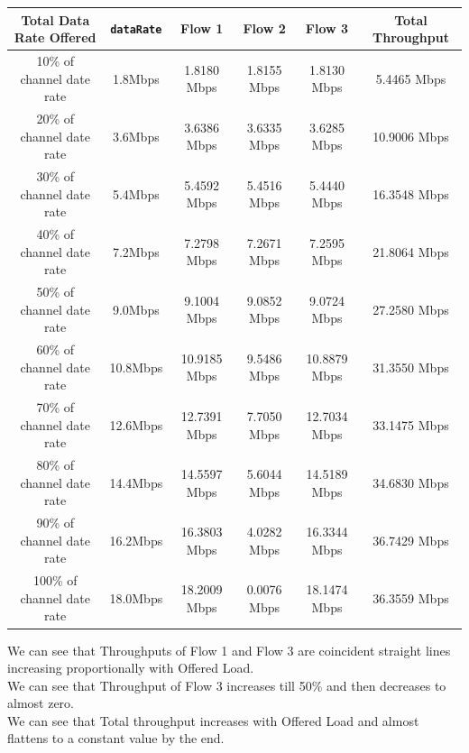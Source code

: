 \documentclass[11pt, fleqn]{article}
\begin{document}
\begin{table}[H]
    \centering
    \begin{tabular}{||c|c||c|c|c||c||}
         \hline
         Total Data Rate Offered & \texttt{dataRate} & Flow 1 & Flow 2 & Flow 3 & Total Throughput \\
         \hline %
         10\% of channel date rate & 1.8Mbps & 1.8180 Mbps & 1.8155 Mbps & 1.8130 Mbps & 5.4465 Mbps \\
         \hline %
         20\% of channel date rate & 3.6Mbps & 3.6386 Mbps & 3.6335 Mbps & 3.6285 Mbps & 10.9006 Mbps \\
         \hline %
         30\% of channel date rate & 5.4Mbps & 5.4592 Mbps & 5.4516 Mbps & 5.4440 Mbps & 16.3548 Mbps \\
         \hline %
         40\% of channel date rate & 7.2Mbps & 7.2798 Mbps & 7.2671 Mbps & 7.2595 Mbps & 21.8064 Mbps \\
         \hline %
         50\% of channel date rate & 9.0Mbps & 9.1004 Mbps & 9.0852 Mbps & 9.0724 Mbps & 27.2580 Mbps \\
         \hline %
         60\% of channel date rate & 10.8Mbps & 10.9185 Mbps & 9.5486 Mbps & 10.8879 Mbps & 31.3550 Mbps \\
         \hline %
         70\% of channel date rate & 12.6Mbps & 12.7391 Mbps & 7.7050 Mbps & 12.7034 Mbps & 33.1475 Mbps \\
         \hline %
         80\% of channel date rate & 14.4Mbps & 14.5597 Mbps & 5.6044 Mbps & 14.5189 Mbps & 34.6830 Mbps \\
         \hline %
         90\% of channel date rate & 16.2Mbps & 16.3803 Mbps & 4.0282 Mbps & 16.3344 Mbps & 36.7429 Mbps \\
         \hline %
         100\% of channel date rate & 18.0Mbps & 18.2009 Mbps & 0.0076 Mbps & 18.1474 Mbps & 36.3559 Mbps \\
         \hline         
    \end{tabular}
\end{table}

We can see that Throughputs of Flow 1 and Flow 3 are coincident straight lines increasing proportionally with Offered Load. \\
We can see that Throughput of Flow 3 increases till 50\% and then decreases to almost zero. \\
We can see that Total throughput increases with Offered Load and almost flattens to a constant value by the end. \\
\end{document}
